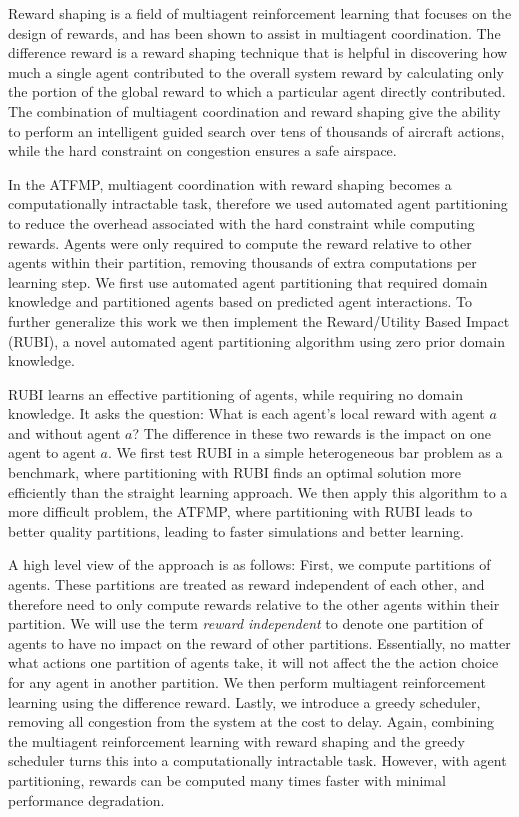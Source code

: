 \documentclass[onehalf,11pt]{beavtex}
\begin{document}
Reward shaping is a field of multiagent reinforcement learning that focuses on the design of rewards, and has been shown to assist in multiagent coordination. The difference reward is a reward shaping technique that is helpful in discovering how much a single agent contributed to the overall system reward by calculating only the portion of the global reward to which a particular agent directly contributed. The combination of multiagent coordination and reward shaping give the ability to perform an intelligent guided search over tens of thousands of aircraft actions, while the hard constraint on congestion ensures a safe airspace.

In the ATFMP, multiagent coordination with reward shaping becomes a computationally intractable task, therefore we used automated agent partitioning to reduce the overhead associated with the hard constraint while computing rewards. Agents were only required to compute the reward relative to other agents within their partition, removing thousands of extra computations per learning step. We first use automated agent partitioning that required domain knowledge and partitioned agents based on predicted agent interactions. To further generalize this work we then implement the Reward/Utility Based Impact (RUBI), a novel automated agent partitioning algorithm using zero prior domain knowledge.

RUBI learns an effective partitioning of agents, while requiring no domain knowledge. It asks the question: What is each agent's local reward with agent $a$ and without agent $a$? The difference in these two rewards is the impact on one agent to agent $a$. We first test RUBI in a simple heterogeneous bar problem as a benchmark, where partitioning with RUBI finds an optimal solution more efficiently than the straight learning approach. We then apply this algorithm to a more difficult problem, the ATFMP, where partitioning with RUBI leads to better quality partitions, leading to faster simulations and better learning.

A high level view of the approach is as follows: First, we compute partitions of agents. These partitions are treated as reward independent of each other, and therefore need to only compute rewards relative to the other agents within their partition. We will use the term \textit{reward independent} to denote one partition of agents to have no impact on the reward of other partitions. Essentially, no matter what actions one partition of agents take, it will not affect the the action choice for any agent in another partition. We then perform multiagent reinforcement learning using the difference reward. Lastly, we introduce a greedy scheduler, removing all congestion from the system at the cost to delay. Again, combining the multiagent reinforcement learning with reward shaping and the greedy scheduler turns this into a computationally intractable task. However, with agent partitioning, rewards can be computed many times faster with minimal performance degradation.
\end{document}
